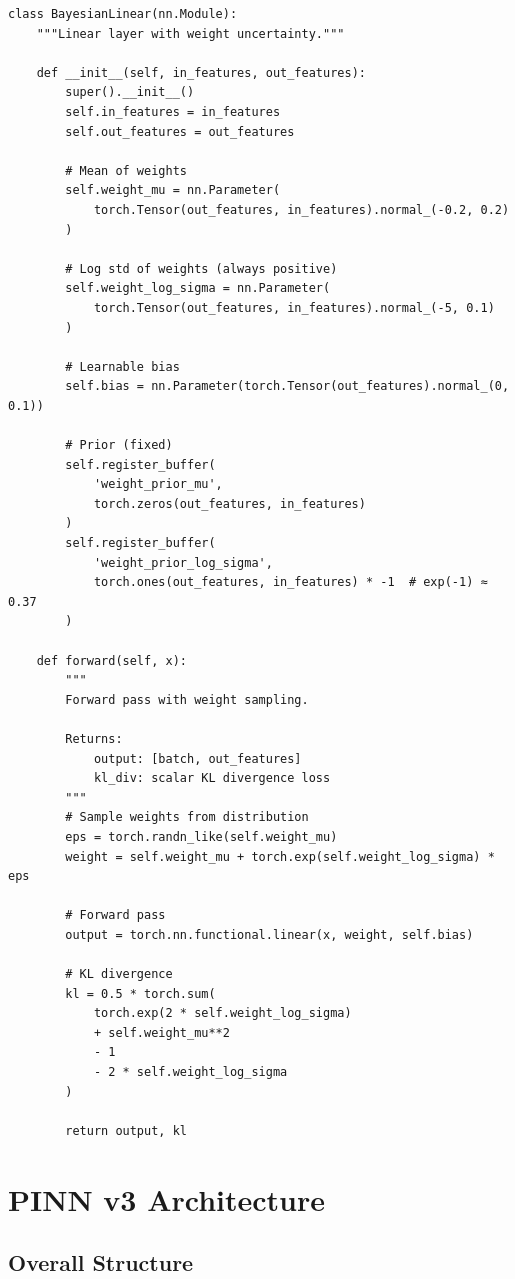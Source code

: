 \documentclass[12pt,a4paper,oneside]{report}
\begin{document}
\begin{lstlisting}
class BayesianLinear(nn.Module):
    """Linear layer with weight uncertainty."""

    def __init__(self, in_features, out_features):
        super().__init__()
        self.in_features = in_features
        self.out_features = out_features

        # Mean of weights
        self.weight_mu = nn.Parameter(
            torch.Tensor(out_features, in_features).normal_(-0.2, 0.2)
        )

        # Log std of weights (always positive)
        self.weight_log_sigma = nn.Parameter(
            torch.Tensor(out_features, in_features).normal_(-5, 0.1)
        )

        # Learnable bias
        self.bias = nn.Parameter(torch.Tensor(out_features).normal_(0, 0.1))

        # Prior (fixed)
        self.register_buffer(
            'weight_prior_mu',
            torch.zeros(out_features, in_features)
        )
        self.register_buffer(
            'weight_prior_log_sigma',
            torch.ones(out_features, in_features) * -1  # exp(-1) ≈ 0.37
        )

    def forward(self, x):
        """
        Forward pass with weight sampling.

        Returns:
            output: [batch, out_features]
            kl_div: scalar KL divergence loss
        """
        # Sample weights from distribution
        eps = torch.randn_like(self.weight_mu)
        weight = self.weight_mu + torch.exp(self.weight_log_sigma) * eps

        # Forward pass
        output = torch.nn.functional.linear(x, weight, self.bias)

        # KL divergence
        kl = 0.5 * torch.sum(
            torch.exp(2 * self.weight_log_sigma)
            + self.weight_mu**2
            - 1
            - 2 * self.weight_log_sigma
        )

        return output, kl
\end{lstlisting}

\section{PINN v3 Architecture}

\subsection{Overall Structure}
\end{document}

